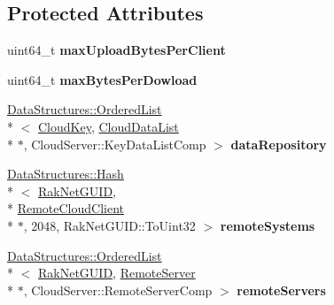\subsection*{Protected Attributes}
\begin{DoxyCompactItemize}
\item 
\hypertarget{class_rak_net_1_1_cloud_server_a3daaa9d08a28e0caeb517a1d809eb58d}{uint64\-\_\-t {\bfseries max\-Upload\-Bytes\-Per\-Client}}\label{class_rak_net_1_1_cloud_server_a3daaa9d08a28e0caeb517a1d809eb58d}

\item 
\hypertarget{class_rak_net_1_1_cloud_server_ac3ddcb977fbe54c26b3e30a16b875dae}{uint64\-\_\-t {\bfseries max\-Bytes\-Per\-Dowload}}\label{class_rak_net_1_1_cloud_server_ac3ddcb977fbe54c26b3e30a16b875dae}

\item 
\hypertarget{class_rak_net_1_1_cloud_server_a15621695644c388e9ff76763f7e7b0b0}{\hyperlink{class_data_structures_1_1_ordered_list}{Data\-Structures\-::\-Ordered\-List}\\*
$<$ \hyperlink{struct_rak_net_1_1_cloud_key}{Cloud\-Key}, \hyperlink{struct_rak_net_1_1_cloud_server_1_1_cloud_data_list}{Cloud\-Data\-List} \\*
$\ast$, Cloud\-Server\-::\-Key\-Data\-List\-Comp $>$ {\bfseries data\-Repository}}\label{class_rak_net_1_1_cloud_server_a15621695644c388e9ff76763f7e7b0b0}

\item 
\hypertarget{class_rak_net_1_1_cloud_server_a363ee6c4b7ea59be6ad89de3dc5367a5}{\hyperlink{class_data_structures_1_1_hash}{Data\-Structures\-::\-Hash}\\*
$<$ \hyperlink{struct_rak_net_1_1_rak_net_g_u_i_d}{Rak\-Net\-G\-U\-I\-D}, \\*
\hyperlink{struct_rak_net_1_1_cloud_server_1_1_remote_cloud_client}{Remote\-Cloud\-Client} \\*
$\ast$, 2048, Rak\-Net\-G\-U\-I\-D\-::\-To\-Uint32 $>$ {\bfseries remote\-Systems}}\label{class_rak_net_1_1_cloud_server_a363ee6c4b7ea59be6ad89de3dc5367a5}

\item 
\hypertarget{class_rak_net_1_1_cloud_server_ad85011746ce3177c26cf66217357eb17}{\hyperlink{class_data_structures_1_1_ordered_list}{Data\-Structures\-::\-Ordered\-List}\\*
$<$ \hyperlink{struct_rak_net_1_1_rak_net_g_u_i_d}{Rak\-Net\-G\-U\-I\-D}, \hyperlink{struct_rak_net_1_1_cloud_server_1_1_remote_server}{Remote\-Server} \\*
$\ast$, Cloud\-Server\-::\-Remote\-Server\-Comp $>$ {\bfseries remote\-Servers}}\label{class_rak_net_1_1_cloud_server_ad85011746ce3177c26cf66217357eb17}


\end{DoxyCompactItemize}
